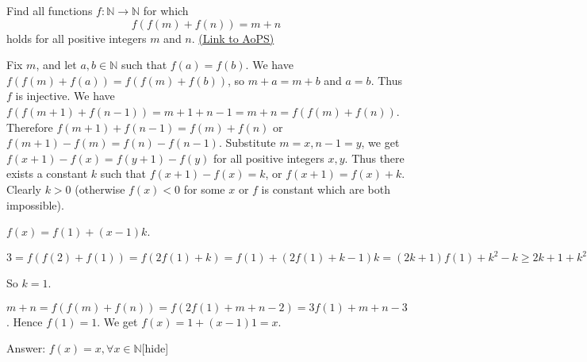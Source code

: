 \begin{problem}
	Find all functions $f: \mathbb N \to \mathbb N$ for which
\[ f(f(m) + f(n)) = m + n\]
holds for all positive integers $m$ and $n$.
	\flushright \href{https://artofproblemsolving.com/community/c6h316531}{(Link to AoPS)}
\end{problem}



\begin{solution}Fix $ m$, and let $ a,b\in\mathbb{N}$ such that $ f(a)=f(b)$. We have $ f(f(m)+f(a))=f(f(m)+f(b))$, so $ m+a=m+b$ and $ a=b$. Thus $ f$ is injective. We have $ f(f(m+1)+f(n-1))=m+1+n-1=m+n=f(f(m)+f(n))$. Therefore $ f(m+1)+f(n-1)=f(m)+f(n)$ or $ f(m+1)-f(m)=f(n)-f(n-1)$. Substitute $ m=x,n-1=y$, we get $ f(x+1)-f(x)=f(y+1)-f(y)$ for all positive integers $ x,y$. Thus there exists a constant $ k$ such that $ f(x+1)-f(x)=k$, or $ f(x+1)=f(x)+k$. Clearly $ k>0$ (otherwise $ f(x)<0$ for some $ x$ or $ f$ is constant which are both impossible).

$ f(x)=f(1)+(x-1)k$.

$ 3=f(f(2)+f(1))=f(2f(1)+k)=f(1)+(2f(1)+k-1)k=(2k+1)f(1)+k^2-k\ge 2k+1+k^2-k=k^2+k+1$

So $ k=1$.

$ m+n=f(f(m)+f(n))=f(2f(1)+m+n-2)=3f(1)+m+n-3$. Hence $ f(1)=1$. We get $ f(x)=1+(x-1)1=x$.

Answer: $ \boxed{f(x)=x,\forall x\in\mathbb{N}}$[\/hide]
\end{solution}



